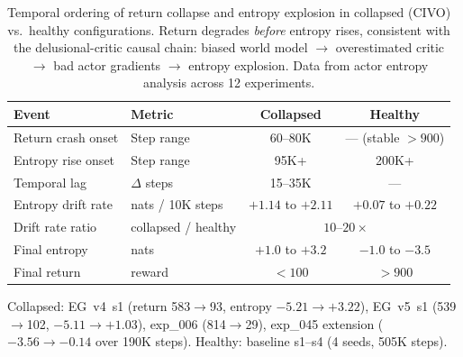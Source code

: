 \begin{table}[t]
\centering
\caption{Temporal ordering of return collapse and entropy explosion in
collapsed (CIVO) vs.\ healthy configurations. Return degrades
\emph{before} entropy rises, consistent with the delusional-critic
causal chain: biased world model $\to$ overestimated critic $\to$
bad actor gradients $\to$ entropy explosion.
Data from actor entropy analysis across 12 experiments.%
\label{tab:temporal-causality}}
\small
\begin{tabular}{@{}llcc@{}}
\toprule
Event & Metric & Collapsed & Healthy \\
\midrule
Return crash onset
  & Step range
  & 60--80K
  & --- (stable $>900$) \\
Entropy rise onset
  & Step range
  & 95K+
  & 200K+ \\
Temporal lag
  & $\Delta$ steps
  & 15--35K
  & --- \\
\midrule
Entropy drift rate
  & nats / 10K steps
  & $+1.14$ to $+2.11$
  & $+0.07$ to $+0.22$ \\
Drift rate ratio
  & collapsed / healthy
  & \multicolumn{2}{c}{$10$--$20\times$} \\
\midrule
Final entropy
  & nats
  & $+1.0$ to $+3.2$
  & $-1.0$ to $-3.5$ \\
Final return
  & reward
  & $< 100$
  & $> 900$ \\
\bottomrule
\end{tabular}

\vspace{2pt}
{\footnotesize
Collapsed: EG~v4~s1 (return 583$\to$93, entropy $-5.21\to+3.22$),
EG~v5~s1 (539$\to$102, $-5.11\to+1.03$),
exp\_006 (814$\to$29), exp\_045 extension ($-3.56\to-0.14$ over 190K steps).
Healthy: baseline s1--s4 (4 seeds, 505K steps).
}
\end{table}
